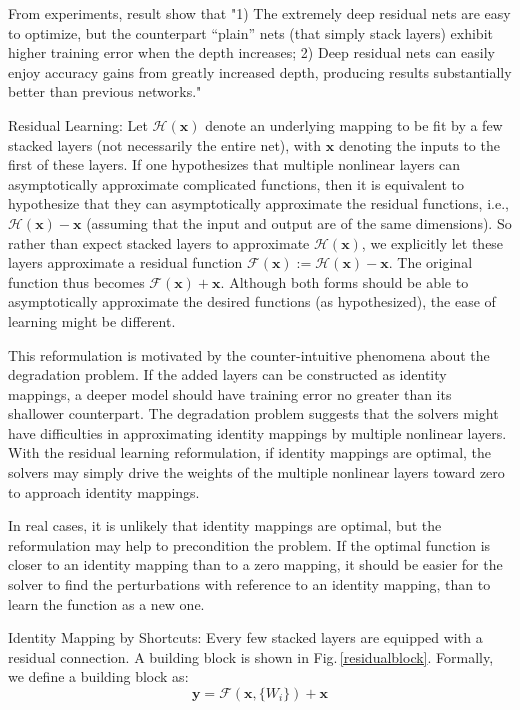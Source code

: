 From experiments, result show that "1) The extremely deep residual nets are easy to optimize, but the counterpart “plain” nets (that simply stack layers) exhibit higher training error when the depth increases; 2) Deep residual nets can easily enjoy accuracy gains from greatly increased depth, producing results substantially better than previous networks." \citep{resnet}

Residual Learning:
Let $\mathcal{H}(\mathbf{x})$ denote an underlying mapping to be fit by a few stacked layers (not necessarily the entire net), with $\mathbf{x}$ denoting the inputs to the first of these layers. If one hypothesizes that multiple nonlinear layers can asymptotically approximate complicated functions, then it is equivalent to hypothesize that they can asymptotically approximate the residual functions, i.e., $\mathcal{H}(\mathbf{x}) - \mathbf{x}$ (assuming that the input and output are of the same dimensions). So rather than expect stacked layers to approximate $\mathcal{H}(\mathbf{x})$, we explicitly let these layers approximate a residual function $\mathcal{F}(\mathbf{x}) := \mathcal{H}(\mathbf{x})-\mathbf{x}$. The original function thus becomes $\mathcal{F}(\mathbf{x})+\mathbf{x}$. Although both forms should be able to asymptotically approximate the desired functions (as hypothesized), the ease of learning might be different. 

This reformulation is motivated by the counter-intuitive phenomena about the degradation problem. If the added layers can be constructed as identity mappings, a deeper model should have training error no greater than its shallower counterpart. The degradation problem suggests that the solvers might have difficulties in approximating identity mappings by multiple nonlinear layers. With the residual learning reformulation, if identity mappings are optimal, the solvers may simply drive the weights of the multiple nonlinear layers toward zero to approach identity mappings. 

In real cases, it is unlikely that identity mappings are optimal, but the reformulation may help to precondition the problem. If the optimal function is closer to an identity mapping than to a zero mapping, it should be easier for the solver to find the perturbations with reference to an identity mapping, than to learn the function as a new one.

Identity Mapping by Shortcuts: 
Every few stacked layers are equipped with a residual connection. A building block is shown in Fig.\,\ref{residualblock}. Formally, we define a building block as: 
\begin{equation} \label{eq1}
\mathbf{y} = \mathcal{F} (\mathbf{x}, \{W_i\}) + \mathbf{x}
\end{equation}

